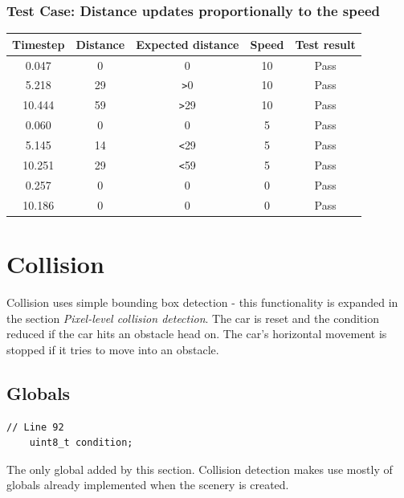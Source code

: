 \documentclass{article}
\begin{document}
\subsubsection*{Test Case: Distance updates proportionally to the speed}
\begin{center}
\begin{tabular}{ c c c c c }
Timestep	& Distance	& Expected distance	& Speed	& Test result		\\ \hline
0.047		& 0		& 0				& 10		& Pass		\\
5.218		& 29		& \verb|>|0			& 10		& Pass		\\
10.444	& 59		& \verb|>|29		& 10		& Pass		\\
0.060		& 0		& 0				& 5		& Pass		\\
5.145		& 14		& \verb|<|29		& 5		& Pass		\\
10.251	& 29		& \verb|<|59		& 5		& Pass		\\
0.257		& 0		& 0				& 0		& Pass		\\
10.186	& 0		& 0				& 0		& Pass		\\ \hline
\end{tabular}
\end{center}

\clearpage

\section{Collision}
Collision uses simple bounding box detection - this functionality is expanded in the section \emph{Pixel-level collision detection}. The car is reset and the condition reduced if the car hits an obstacle head on. The car's horizontal movement is stopped if it tries to move into an obstacle. 

\subsection*{Globals}
\begin{lstlisting}[style=CStyle]
	// Line 92
	uint8_t condition;
\end{lstlisting}
The only global added by this section. Collision detection makes use mostly of globals already implemented when the scenery is created. 
\newline
\end{document}
